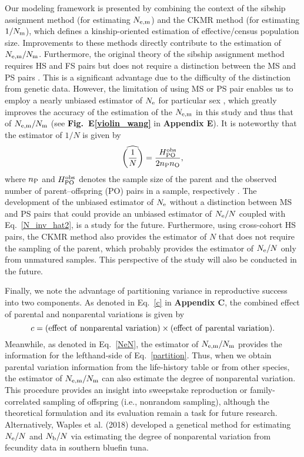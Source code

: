 \documentclass[12pt, English]{article}
\begin{document}
\begin{spacing}{1.9}
Our modeling framework is presented by combining the context of the sibship assignment method (for estimating $N_{\rm e,m}$) and the CKMR method (for estimating $1/N_{\rm m}$), which defines a kinship-oriented estimation of effective/census population size. Improvements to these methods directly contribute to the estimation of $N_{\rm e,m}/N_{\rm m}$. Furthermore, the original theory of the sibship assignment method requires HS and FS pairs but does not require a distinction between the MS and PS pairs \cite[]{wang2009new}. This is a significant advantage due to the difficulty of the distinction from genetic data. However, the limitation of using MS or PS pair enables us to employ a nearly unbiased estimator of $N_{\rm e}$ for particular sex \cite[]{Akita_2019}, which greatly improves the accuracy of the estimation of the $N_{\rm e,m}$ in this study and thus that of $N_{\rm e,m}/N_{\rm m}$ (see {\bf Fig.~E\ref{violin_wang}} in {\bf Appendix E}). It is noteworthy that the estimator of $1/N$ is given by 
\begin{equation}
\widehat{\left(\frac{1}{N}\right)} = \frac{H_{\rm PO}^{\rm obs} } {2n_{\rm P}n_{\rm O}},
\label{N_inv_hat2}
\end{equation}
where $n_{\rm P}$ and $H_{\rm PO}^{\rm obs}$ denotes the sample size of the parent and the observed number of parent--offspring (PO) pairs in a sample, respectively \cite[]{bravington2016close}. The development of the unbiased estimator of $N_{\rm e}$ without a distinction between MS and PS pairs that could provide an unbiased estimator of $N_{\rm e}/N$ coupled with Eq.~\ref{N_inv_hat2}, is a study for the future. Furthermore, using cross-cohort HS pairs, the CKMR method also provides the estimator of $N$ \cite[]{bravington2016close} that does not require the sampling of the parent, which probably provides the estimator of $N_{\rm e}/N$ only from unmatured samples. This perspective of the study will also be conducted in the future.

Finally, we note the advantage of partitioning variance in reproductive success into two components. As denoted in Eq.~\ref{c} in {\bf Appendix C}, the combined effect of parental and nonparental variations is given by 
\begin{equation}
c = ({\rm effect\ of\ nonparental\ variation}) \times ({\rm effect\ of\ parental\ variation}).
\label{partition}
\end{equation}
Meanwhile, as denoted in Eq.~\ref{NeN}, the estimator of $N_{\rm e,m}/N_{\rm m}$ provides the information for the lefthand-side of Eq.~\ref{partition}. Thus, when we obtain parental variation information from the life-history table or from other species, the estimator of $N_{\rm e,m}/N_{\rm m}$ can also estimate the degree of nonparental variation. This procedure provides an insight into sweepstake reproduction or family-correlated sampling of offspring (i.e., nonrandom sampling), although the theoretical formulation and its evaluation remain a task for future research. Alternatively, Waples et al. (2018) developed a genetical method for estimating $N_{\rm e}/N$ and $N_{\rm b}/N$ via estimating the degree of nonparental variation from fecundity data in southern bluefin tuna. 


\end{spacing}
\end{document}
